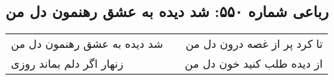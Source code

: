 \begin{center}
\section*{رباعی شماره ۵۵۰: شد دیده به عشق رهنمون دل من}
\label{sec:sh550}
\begin{longtable}{l p{0.5cm} r}
شد دیده به عشق رهنمون دل من
&&
تا کرد پر از غصه درون دل من
\\
زنهار اگر دلم بماند روزی
&&
از دیده طلب کنید خون دل من
\\
\end{longtable}
\end{center}
